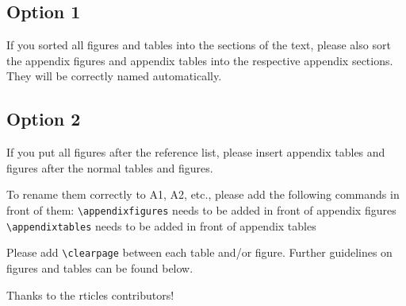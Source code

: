 \documentclass[gmd, manuscript]{copernicus}
\begin{document}
\subsection{Option 1}

If you sorted all figures and tables into the sections of the text,
please also sort the appendix figures and appendix tables into the
respective appendix sections. They will be correctly named
automatically.

\subsection{Option 2}

If you put all figures after the reference list, please insert appendix
tables and figures after the normal tables and figures.

To rename them correctly to A1, A2, etc., please add the following
commands in front of them: \texttt{\textbackslash{}appendixfigures}
needs to be added in front of appendix figures
\texttt{\textbackslash{}appendixtables} needs to be added in front of
appendix tables

Please add \texttt{\textbackslash{}clearpage} between each table and/or
figure. Further guidelines on figures and tables can be found below.
\noappendix




\begin{acknowledgements}
Thanks to the rticles contributors!
\end{acknowledgements}


\end{document}
